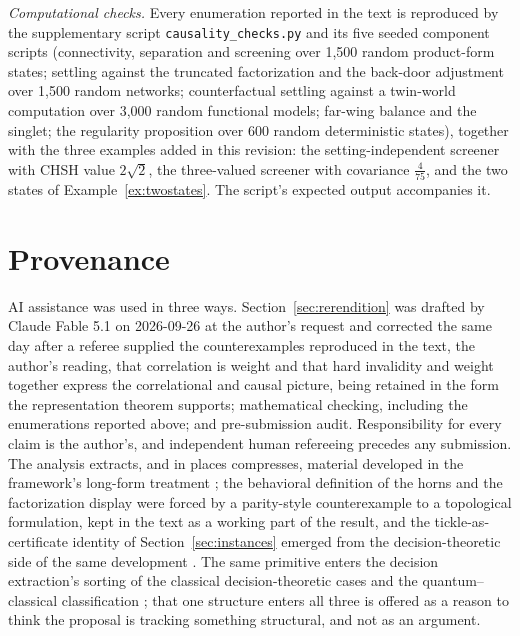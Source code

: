\documentclass[11pt]{article}
\begin{document}
\noindent\textit{Computational checks.} Every enumeration reported in the text is reproduced by the supplementary script \texttt{causality\_checks.py} and its five seeded component scripts (connectivity, separation and screening over 1{,}500 random product-form states; settling against the truncated factorization and the back-door adjustment over 1{,}500 random networks; counterfactual settling against a twin-world computation over 3{,}000 random functional models; far-wing balance and the singlet; the regularity proposition over 600 random deterministic states), together with the three examples added in this revision: the setting-independent screener with CHSH value $2\sqrt2$, the three-valued screener with covariance $\tfrac{4}{75}$, and the two states of Example~\ref{ex:twostates}. The script's expected output accompanies it.

\section*{Provenance}

\noindent AI assistance was used in three ways. Section~\ref{sec:rerendition} was drafted by Claude Fable 5.1 on 2026-09-26 at the author's request and corrected the same day after a referee supplied the counterexamples reproduced in the text, the author's reading, that correlation is weight and that hard invalidity and weight together express the correlational and causal picture, being retained in the form the representation theorem supports; mathematical checking, including the enumerations reported above; and pre-submission audit. Responsibility for every claim is the author's, and independent human refereeing precedes any submission. The analysis extracts, and in places compresses, material developed in the framework's long-form treatment \cite{Aethus}; the behavioral definition of the horns and the factorization display were forced by a parity-style counterexample to a topological formulation, kept in the text as a working part of the result, and the tickle-as-certificate identity of Section~\ref{sec:instances} emerged from the decision-theoretic side of the same development \cite{AethusDecision}. The same primitive enters the decision extraction's sorting of the classical decision-theoretic cases and the quantum--classical classification \cite{AethusDecision, AethusQuant}; that one structure enters all three is offered as a reason to think the proposal is tracking something structural, and not as an argument.

\printbibliography
\end{document}
